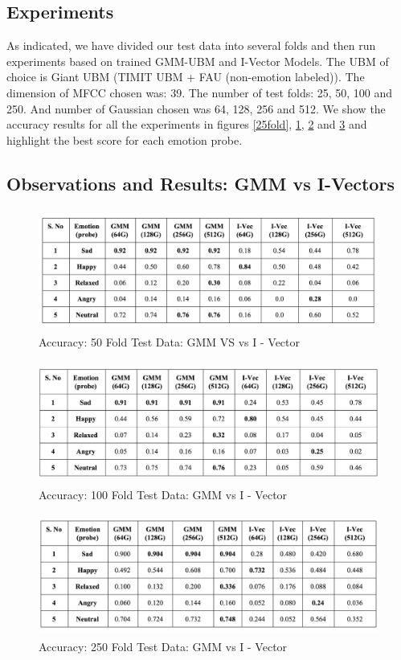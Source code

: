 	\subsection{Experiments}
	As indicated, we have divided our test data into several folds and then run experiments based on trained GMM-UBM and I-Vector Models. The UBM of choice is Giant UBM (TIMIT UBM + FAU (non-emotion labeled)). The dimension of MFCC chosen was: 39. The number of test folds: 25, 50, 100 and 250. And number of Gaussian chosen was 64, 128, 256 and 512. We show the accuracy results for all the experiments in figures \ref{25fold}, \ref{50fold}, \ref{100fold} and \ref{250fold}  and highlight the best score for each emotion probe.
 	\subsection{Observations and Results: GMM vs I-Vectors}
\begin{figure}[ht!]
	\centering
		\includegraphics[height=40mm,  width=130mm]{figures/7_50fold.png}
		\caption[Emotion Recognition - Accuracy over 50 fold]{Accuracy: 50 Fold Test Data:  GMM VS vs I - Vector}
			\label{50fold}
\end{figure}

\begin{figure}[ht!]
	\centering
		\includegraphics[height=40mm,  width=130mm]{figures/7_100fold.png}
		\caption[Emotion Recognition - Accuracy over 100 fold]{Accuracy: 100 Fold Test Data:  GMM vs I - Vector}
			\label{100fold}
\end{figure}

\begin{figure}[ht!]
	\centering
		\includegraphics[height=40mm,  width=130mm]{figures/7_250fold.png}
		\caption[Emotion Recognition - Accuracy over 250 fold]{Accuracy: 250 Fold Test Data:  GMM vs I - Vector}
			\label{250fold}
\end{figure}

